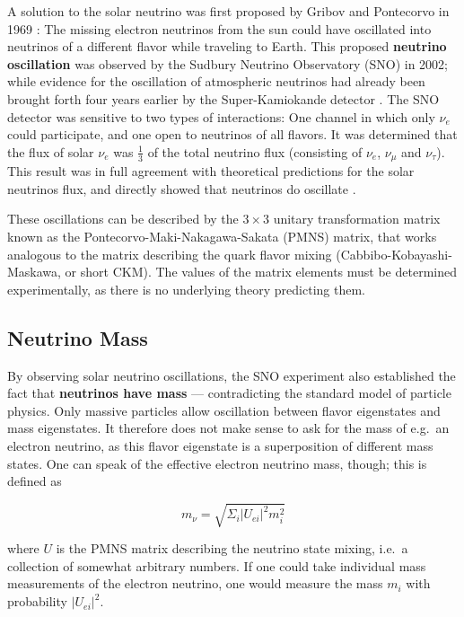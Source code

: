 A solution to the solar neutrino was first proposed by Gribov and Pontecorvo in 1969 : The missing electron neutrinos from the sun could have oscillated into neutrinos of a different flavor while traveling to Earth. This proposed \textbf{neutrino oscillation} was observed by the Sudbury Neutrino Observatory (SNO) in 2002; while evidence for the oscillation of atmospheric neutrinos had already been brought forth four years earlier by the Super-Kamiokande detector . The SNO detector was sensitive to two types of interactions: One channel in which only $\nu_e$ could participate, and one open to neutrinos of all flavors. It was determined that the flux of solar $\nu_e$ was $\frac{1}{3}$ of the total neutrino flux (consisting of $\nu_e$, $\nu_\mu$ and $\nu_\tau$). This result was in full agreement with theoretical predictions for the solar neutrinos flux, and directly showed that neutrinos do oscillate .

These oscillations can be described by the $3\times3$ unitary transformation matrix known as the Pontecorvo-Maki-Nakagawa-Sakata (PMNS) matrix, that works analogous to the matrix describing the quark flavor mixing (Cabbibo-Kobayashi-Maskawa, or short CKM). The values of the matrix elements must be determined experimentally, as there is no underlying theory predicting them.

\subsection{Neutrino Mass}
By observing solar neutrino oscillations, the SNO experiment also established the fact that \textbf{neutrinos have mass} --- contradicting the standard model of particle physics. Only massive particles allow oscillation between flavor eigenstates and mass eigenstates. It therefore does not make sense to ask for the mass of e.g.\ an electron neutrino, as this flavor eigenstate is a superposition of different mass states. One can speak of the effective electron neutrino mass, though; this is defined as

\begin{equation}\label{pmns}
    m_\nu = \sqrt{ \Sigma_i |U_{ei}|^2 m_i^2 }
\end{equation}

where $U$ is the PMNS matrix describing the neutrino state mixing, i.e.\ a collection of somewhat arbitrary numbers. If one could take individual mass measurements of the electron neutrino, one would measure the mass $m_i$ with probability $|U_{ei}|^2$.

